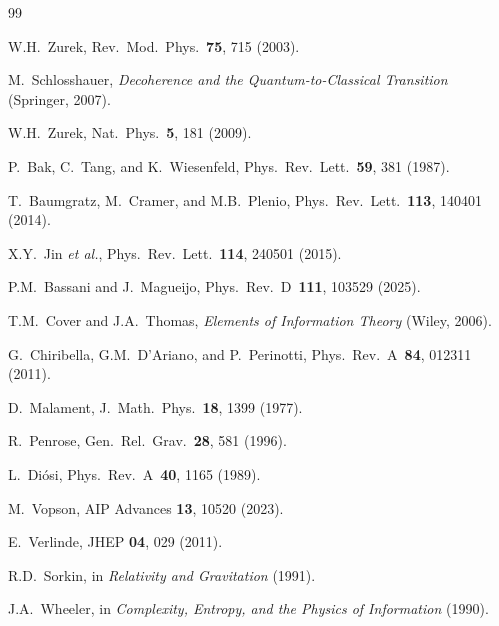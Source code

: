 \documentclass[reprint]{revtex4-2}
\begin{document}
\begin{thebibliography}{99}

 W.H.~Zurek, Rev.~Mod.~Phys.~\textbf{75}, 715 (2003).

 M.~Schlosshauer, \emph{Decoherence and the Quantum-to-Classical Transition} (Springer, 2007).

 W.H.~Zurek, Nat.~Phys.~\textbf{5}, 181 (2009).

 P.~Bak, C.~Tang, and K.~Wiesenfeld, Phys.~Rev.~Lett.~\textbf{59}, 381 (1987).

 T.~Baumgratz, M.~Cramer, and M.B.~Plenio, Phys.~Rev.~Lett.~\textbf{113}, 140401 (2014).

 X.Y.~Jin \emph{et al.}, Phys.~Rev.~Lett.~\textbf{114}, 240501 (2015).

 P.M.~Bassani and J.~Magueijo, Phys.~Rev.~D~\textbf{111}, 103529 (2025).

 T.M.~Cover and J.A.~Thomas, \emph{Elements of Information Theory} (Wiley, 2006).

 G.~Chiribella, G.M.~D'Ariano, and P.~Perinotti, Phys.~Rev.~A~\textbf{84}, 012311 (2011).

 D.~Malament, J.~Math.~Phys.~\textbf{18}, 1399 (1977).

 R.~Penrose, Gen.~Rel.~Grav.~\textbf{28}, 581 (1996).

 L.~Di\'osi, Phys.~Rev.~A~\textbf{40}, 1165 (1989).

 M.~Vopson, AIP Advances \textbf{13}, 10520 (2023).

 E.~Verlinde, JHEP \textbf{04}, 029 (2011).

 R.D.~Sorkin, in \emph{Relativity and Gravitation} (1991).

 J.A.~Wheeler, in \emph{Complexity, Entropy, and the Physics of Information} (1990).

\end{thebibliography}
\end{document}
